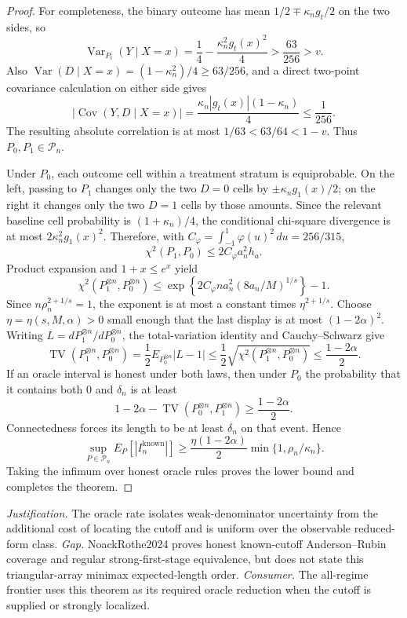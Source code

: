 \documentclass{article}
\begin{document}
\begin{proof}
For completeness, the binary outcome has mean \(1/2\mp\kappa_ng_t/2\) on the two sides, so
\[
 \operatorname{Var}_{P_t}(Y\mid X=x)=\frac14-\frac{\kappa_n^2g_t(x)^2}{4}>\frac{63}{256}>v.
\]
Also \(\operatorname{Var}(D\mid X=x)=(1-\kappa_n^2)/4\ge63/256\), and a direct two-point covariance calculation on either side gives
\[
 |\operatorname{Cov}(Y,D\mid X=x)|=\frac{\kappa_n|g_t(x)|(1-\kappa_n)}4\le\frac1{256}.
\]
The resulting absolute correlation is at most \(1/63<63/64<1-v\).  Thus \(P_0,P_1\in\mathcal P_n\).

Under \(P_0\), each outcome cell within a treatment stratum is equiprobable.  On the left, passing to \(P_1\) changes only the two \(D=0\) cells by \(\pm\kappa_ng_1(x)/2\); on the right it changes only the two \(D=1\) cells by those amounts.  Since the relevant baseline cell probability is \((1+\kappa_n)/4\), the conditional chi-square divergence is at most \(2\kappa_n^2g_1(x)^2\).  Therefore, with \(C_\varphi=\int_{-1}^1\varphi(u)^2\,du=256/315\),
\[
 \chi^2(P_1,P_0)\le2C_\varphi a_n^2h_a.
\]
Product expansion and \(1+x\le e^x\) yield
\[
 \chi^2(P_1^{\otimes n},P_0^{\otimes n})
 \le\exp\left\{2C_\varphi n a_n^2(8a_n/M)^{1/s}\right\}-1.
\]
Since \(n\rho_n^{2+1/s}=1\), the exponent is at most a constant times \(\eta^{2+1/s}\).  Choose \(\eta=\eta(s,M,\alpha)>0\) small enough that the last display is at most \((1-2\alpha)^2\).  Writing \(L=dP_1^{\otimes n}/dP_0^{\otimes n}\), the total-variation identity and Cauchy--Schwarz give
\[
 \operatorname{TV}(P_1^{\otimes n},P_0^{\otimes n})
 =\frac12E_{P_0^{\otimes n}}|L-1|
 \le\frac12\sqrt{\chi^2(P_1^{\otimes n},P_0^{\otimes n})}
 \le\frac{1-2\alpha}{2}.
\]
If an oracle interval is honest under both laws, then under \(P_0\) the probability that it contains both \(0\) and \(\delta_n\) is at least
\[
 1-2\alpha-\operatorname{TV}(P_0^{\otimes n},P_1^{\otimes n})
 \ge\frac{1-2\alpha}{2}.
\]
Connectedness forces its length to be at least \(\delta_n\) on that event.  Hence
\[
 \sup_{P\in\mathcal P_n}E_P[|I_n^{\mathrm{known}}|]
 \ge\frac{\eta(1-2\alpha)}2\min\{1,\rho_n/\kappa_n\}.
\]
Taking the infimum over honest oracle rules proves the lower bound and completes the theorem.
\end{proof}
\par\smallskip\noindent \textit{Justification.} The oracle rate isolates weak-denominator uncertainty from the additional cost of locating the cutoff and is uniform over the observable reduced-form class. \textit{Gap.} NoackRothe2024 proves honest known-cutoff Anderson--Rubin coverage and regular strong-first-stage equivalence, but does not state this triangular-array minimax expected-length order. \textit{Consumer.} The all-regime frontier uses this theorem as its required oracle reduction when the cutoff is supplied or strongly localized.
\end{document}
